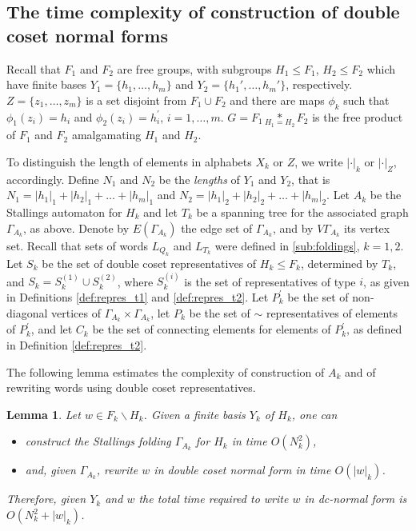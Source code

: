 \documentclass[a4paper,12pt]{article}
\newcommand{\G}{\Gamma }
\newtheorem{lemma}[theorem]{Lemma}
\numberwithin{equation}{section}
\numberwithin{figure}{section}
\begin{document}
\subsection{The time complexity of construction of double coset normal forms}\label{sub:doubleCo_nf}

Recall that $F_1$ and  $F_2$ are free groups, with subgroups $H_1 \leq
F_1$, $H_2 \leq F_2$ which have finite bases $Y_1 = \{h_1, \ldots, h_m
\}$ and $Y_2=\{h_1', \ldots, h_m'\}$, respectively.  $Z=\{z_1,\ldots ,z_m\}$
is a set disjoint from $F_1\cup F_2$ and there are
maps $\phi_k$ such that $\phi_1(z_i)=h_i$ and
$\phi_2(z_i)=h^\prime_i$, $i=1,\ldots ,m$.
 $G = F_1 \underset{H_1=H_2}{\ast} F_2$ is the free product of $F_1$ and $F_2$
amalgamating $H_1$ and $H_2$.

To distinguish the length of elements in alphabets $X_k$ or
$Z$, we write $|\cdot|_k$ or $|\cdot|_Z$, accordingly. Define  $N_1$ and $N_2$
be the \emph{lengths} of $Y_1$ and $Y_2$, that is
$N_1 = |h_1|_1 + |h_2|_1 + \ldots + |h_m|_1$ and $N_2 = |h_1|_2 +
|h_2|_2 + \ldots + |h_m|_2$. Let $A_k$ be the Stallings automaton
for $H_k$ and let $T_k$ be a spanning tree for the associated
graph $\G_{A_k}$, as above. Denote by $E(\G_{A_k})$ the  edge set
of $\G_{A_k}$, and by $V\G_{A_k}$  its vertex set.
Recall that sets of words  $L_{Q_k}$ and $L_{T_k}$
were defined in \ref{sub:foldings}, $k=1,2$. Let $S_k$ be the set of
double coset representatives of $H_k\le F_k$, determined by $T_k$, and
 $S_k=S_k^{(1)}\cup S_k^{(2)}$, where $S_k^{(i)}$ is the set
of representatives of type $i$, as given in Definitions \ref{def:repres_t1}
and \ref{def:repres_t2}.  Let $P_k^\prime$ be the set of non-diagonal
vertices of $\G_{A_k}\times \G_{A_k}$, let $P_k$ be the set of
$\sim$ representatives of elements of $P_k^\prime$, and let $C_k$ be
the set of connecting elements for elements of $P_k^\prime$, as defined in
Definition \ref{def:repres_t2}.


The following lemma estimates the complexity of
construction of $A_k$ and of rewriting words using
double coset representatives.
\begin{lemma}\label{lem:dctransversal} Let $w \in F_k \smallsetminus H_k$. Given a finite basis $Y_k$ of $H_k$, one can
\begin{itemize}
\item construct the Stallings folding $\G_{A_k}$ for $H_k$ in time $O(N_k^2)$,
\item and, given $\G_{A_k}$,
rewrite $w$ in  double coset normal
form in time  $O(|w|_k)$.
\end{itemize}
Therefore, given $Y_k$ and $w$ the total time required to write $w$ in dc-normal
 form is  $O(N_k^2 + |w|_k)$.
\end{lemma}
\end{document}
